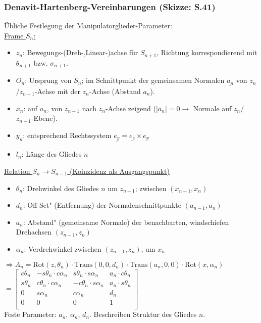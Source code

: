 \documentclass[a4paper,landscape,6pt]{article}
\newcommand{\mat}[1]{\ensuremath{\begin{bmatrix} #1 \end{bmatrix}}}				%
\newcommand{\ul}[1]{\underline{#1}}
\begin{document}
\begin{multicols}{3}
\subsubsection*{Denavit-Hartenberg-Vereinbarungen \footnotesize{(Skizze: S.41)}}
Übliche Festlegung der Manipulatorglieder-Parameter:\\
\ul{Frame $S_n$:}
\begin{itemize}
	\item $z_n$: Bewegungs-(Dreh-,Linear-)achse für $S_{n+1}$, Richtung korrespondierend mit $\theta_{n+1}$ bzw. $\sigma_{n+1}$.
	\item $O_n$: Ursprung von $S_n$; im Schnittpunkt der gemeinsamen Normalen $\ul{a_n}$ von $z_n$/$z_{n-1}$-Achse mit der $z_n$-Achse (Abstand $a_n$).
	\item $x_n$: auf $a_n$, von $z_{n-1}$ nach $z_n$-Achse zeigend ($|a_n| = 0 \rightarrow $ Normale auf $z_n$/$z_{n-1}$-Ebene).
	\item $y_n$: entsprechend Rechtssystem $\ul{e_y} = \ul{e_z} \times \ul{e_x}$
	\item $l_n$: Länge des Gliedes $n$
\end{itemize}
\ul{Relation $S_n \rightarrow S_{n-1}$ (Koinzidenz als Ausgangspunkt)}
	\begin{itemize}
		\item $\theta_n$: Drehwinkel des Gliedes $n$ um $z_{n-1}$; zwischen $(x_{n-1},x_n)$
		\item $d_n$: \glqq Off-Set" (Entfernung) der Normalenschnittpunkte $(a_{n-1},a_n)$
		\item $a_n$: \glqq Abstand" (gemeinsame Normale) der benachbarten, windschiefen Drehachsen $(z_{n-1},z_n)$
		\item $\alpha_n$: Verdrehwinkel zwischen $(z_{n-1}, z_n)$, um $x_n$
	\end{itemize}
$\Rightarrow A_n = \text{Rot}(z,\theta_n) \cdot \text{Trans}(0,0,d_n) \cdot \text{Trans}(a_n,0,0) \cdot \text{Rot}(x,\alpha_n)$\\
$= \mat{c\theta_n & -s\theta_n \cdot c\alpha_n & s\theta_n \cdot s\alpha_n & a_n \cdot c\theta_n \\
	s\theta_n & c\theta_n \cdot c\alpha_n & -c\theta_n \cdot s\alpha_n & a_n \cdot s\theta_n \\
	0 & s\alpha_n & c\alpha_n & d_n \\
	0 & 0 & 0 & 1 \\ }$\\
\newpage
Feste Parameter: $a_n$, $\alpha_n$, $d_n$. Beschreiben Struktur des Gliedes $n$.\\

\end{multicols}
\end{document}

